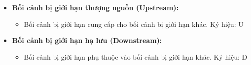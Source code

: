 \begin{itemize}

    \item \textbf{Bối cảnh bị giới hạn thượng nguồn (Upstream):}

          \begin{itemize}

              \item Bối cảnh bị giới hạn cung cấp cho bối cảnh bị giới hạn khác.  Ký hiệu: U

          \end{itemize}

    \item \textbf{Bối cảnh bị giới hạn hạ lưu (Downstream):}

          \begin{itemize}

              \item Bối cảnh bị giới hạn phụ thuộc vào bối cảnh bị giới hạn khác.  Ký hiệu: D

          \end{itemize}

\end{itemize}

